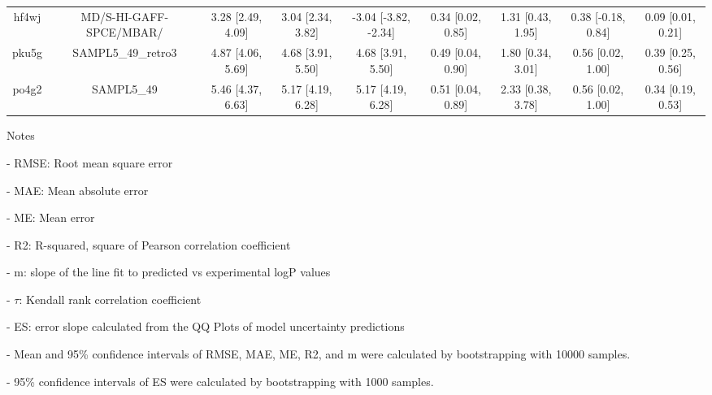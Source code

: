 \documentclass{article}
\begin{document}
\begin{center}
\begin{longtable}{|ccccccccc|}
 hf4wj &                            MD/S-HI-GAFF-SPCE/MBAR/ &  3.28 [2.49, 4.09] &  3.04 [2.34, 3.82] &  -3.04 [-3.82, -2.34] &  0.34 [0.02, 0.85] &    1.31 [0.43, 1.95] &   0.38 [-0.18, 0.84] &     0.09 [0.01, 0.21] \\
 pku5g &                                 SAMPL5\_49\_retro3 &  4.87 [4.06, 5.69] &  4.68 [3.91, 5.50] &     4.68 [3.91, 5.50] &  0.49 [0.04, 0.90] &    1.80 [0.34, 3.01] &    0.56 [0.02, 1.00] &     0.39 [0.25, 0.56] \\
 po4g2 &                                         SAMPL5\_49 &  5.46 [4.37, 6.63] &  5.17 [4.19, 6.28] &     5.17 [4.19, 6.28] &  0.51 [0.04, 0.89] &    2.33 [0.38, 3.78] &    0.56 [0.02, 1.00] &     0.34 [0.19, 0.53] \\
\end{longtable}
\end{center}

Notes

- RMSE: Root mean square error

- MAE: Mean absolute error

- ME: Mean error

- R2: R-squared, square of Pearson correlation coefficient

- m: slope of the line fit to predicted vs experimental logP values

- $\tau$:  Kendall rank correlation coefficient

- ES: error slope calculated from the QQ Plots of model uncertainty predictions

- Mean and 95\% confidence intervals of RMSE, MAE, ME, R2, and m were calculated by bootstrapping with 10000 samples.

- 95\% confidence intervals of ES were calculated by bootstrapping with 1000 samples.\end{document}
\end{document}
